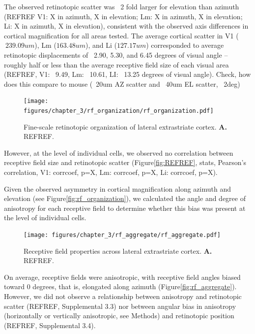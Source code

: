The observed retinotopic scatter was ~2 fold larger for elevation than azimuth (REFREF V1: X in azimuth, X in elevation; Lm: X in azimuth, X in elevation; Li: X in azimuth, X in elevation), consistent with the observed axis differences in cortical magnification for all areas tested. The average cortical scatter in V1 ($~239.09um$), Lm ($163.48 um$), and Li ($127.17 um$) corresponded to average retinotopic displacements of  ~2.90, 5.30, and 6.45 degrees of visual angle -- roughly half or less than the average receptive field size of each visual area (REFREF, V1: ~9.49, Lm: ~10.61, LI: ~13.25 degrees of visual angle). Check, how does this compare to mouse (~20um AZ scatter and ~40um EL scatter, ~2deg)


\begin{figure}[t!]
    \texttt{[image: figures/chapter\_3/rf\_organization/rf\_organization.pdf]}
    \vspace{.1in}
    \caption[Fine-scale retinotopic organization]{Fine-scale retinotopic organization of lateral extrastriate cortex. \textbf{A.} REFREF.
    \label{fig:rf_examples}}
\end{figure}

However, at the level of individual cells, we observed no correlation between receptive field size and retinotopic scatter (Figure\ref{fig:REFREF}, stats, Pearson’s correlation, V1: corrcoef, p=X, Lm: corrcoef, p=X, Li: corrcoef, p=X).

Given the observed asymmetry in cortical magnification along azimuth and elevation (see Figure\ref{fig:rf_organization}), we calculated the angle and degree of anisotropy for each receptive field to determine whether this bias was present at the level of individual cells.

\begin{figure}[t!]
    \texttt{[image: figures/chapter\_3/rf\_aggregate/rf\_aggregate.pdf]}
    \vspace{.1in}
    \caption[Receptive field properties]{Receptive field properties across lateral extrastriate cortex. \textbf{A.} REFREF.
    \label{fig:rf_examples}}
\end{figure}

On average, receptive fields were anisotropic, with receptive field angles biased toward 0 degrees, that is, elongated along azimuth (Figure\ref{fig:rf_aggregate}). However, we did not observe a relationship between anisotropy and retinotopic scatter (REFREF, Supplemental 3.3) nor between angular bias in anisotropy (horizontally or vertically anisotropic, see Methods) and retinotopic position (REFREF, Supplemental 3.4). 

